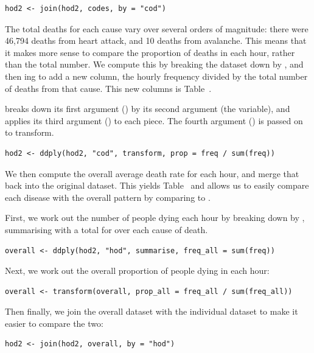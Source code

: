 \documentclass[article]{jss}
\begin{document}
\begin{Verbatim}
hod2 <- join(hod2, codes, by = "cod")
\end{Verbatim}

The total deaths for each cause vary over several orders of magnitude: there were 46,794 deaths from heart attack, and 10 deaths from avalanche. This means that it makes more sense to compare the proportion of deaths in each hour, rather than the total number. We compute this by breaking the dataset down by , and then ing to add a new  column, the hourly frequency divided by the total number of deaths from that cause. This new columns is Table~.

 breaks down its first argument () by its second argument (the  variable), and applies its third argument () to each piece. The fourth argument () is passed on to transform.

\begin{Verbatim}
hod2 <- ddply(hod2, "cod", transform, prop = freq / sum(freq))
\end{Verbatim}

We then compute the overall average death rate for each hour, and merge that back into the original dataset. This yields Table~ and allows us to easily compare each disease with the overall pattern by comparing  to .


First, we work out the number of people dying each hour by breaking down  by , summarising with a total for over each cause of death.

\begin{Verbatim}
overall <- ddply(hod2, "hod", summarise, freq_all = sum(freq))
\end{Verbatim}

Next, we work out the overall proportion of people dying in each hour:

\begin{Verbatim}
overall <- transform(overall, prop_all = freq_all / sum(freq_all))
\end{Verbatim}

Then finally, we join the overall dataset with the individual dataset to make it easier to compare the two:

\begin{Verbatim}
hod2 <- join(hod2, overall, by = "hod")
\end{Verbatim}
\end{document}
